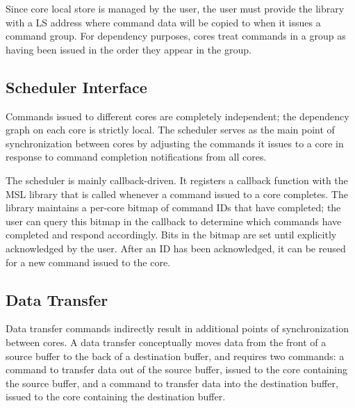 Since core local store is managed by the user, the user must provide
the library with a LS address where command data will be copied to
when it issues a command group. For dependency purposes, cores treat
commands in a group as having been issued in the order they appear in
the group. 

\subsection{Scheduler Interface}

Commands issued to different cores are completely independent; the
dependency graph on each core is strictly local. The scheduler serves
as the main point of synchronization between cores by adjusting the
commands it issues to a core in response to command completion
notifications from all cores.

The scheduler is mainly callback-driven. It registers a callback
function with the MSL library that is called whenever a command issued
to a core completes. The library maintains a per-core bitmap of
command IDs that have completed; the user can query this bitmap in the
callback to determine which commands have completed and respond
accordingly. Bits in the bitmap are set until explicitly acknowledged
by the user. After an ID has been acknowledged, it can be reused for
a new command issued to the core.



\subsection{Data Transfer}

Data transfer commands indirectly result in additional points of
synchronization between cores. A data transfer conceptually moves
data from the front of a source buffer to the back of a destination
buffer, and requires two commands: a command to transfer data out of
the source buffer, issued to the core containing the source
buffer, and a command to transfer data into the destination buffer,
issued to the core containing the destination buffer. 

